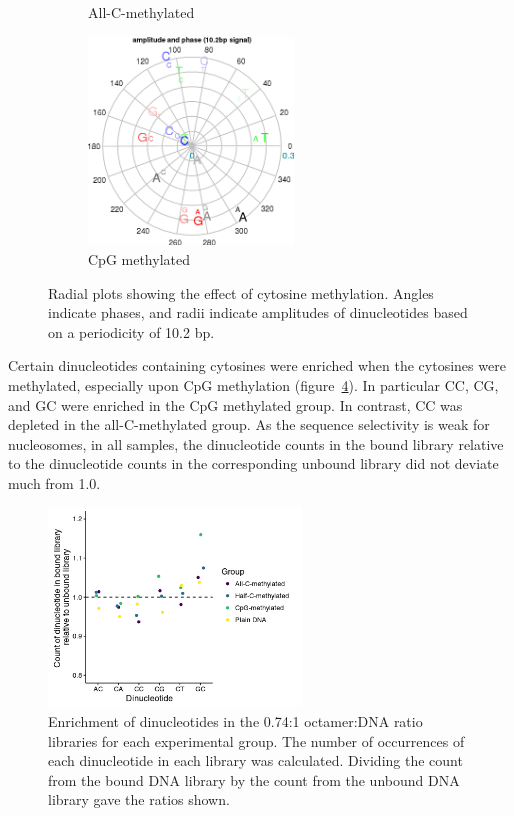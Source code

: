 \documentclass[a4paper, numbers=noenddot]{scrbook}
\begin{document}
\begin{figure}[htbp]
\begin{subfigure}[htbp]{0.6\textwidth}
    \caption{All-C-methylated}
    \label{fig:radial_mc_allmc}
  \end{subfigure}
  \begin{subfigure}[htbp]{0.6\textwidth}
    \centering
    \includegraphics[width=0.6\textwidth]{emsa_h8_radial}
    \caption{CpG methylated}
    \label{fig:radial_mc_cpg}
  \end{subfigure}
  \caption{Radial plots showing the effect of cytosine methylation.  Angles indicate phases, and radii indicate amplitudes of dinucleotides based on a periodicity of 10.2 bp.}
  \label{fig:radial_mc}
\end{figure}

Certain dinucleotides containing cytosines were enriched when the cytosines were methylated, especially upon CpG methylation (figure~\ref{fig:c2nt}).  In particular CC, CG, and GC were enriched in the CpG methylated group.  In contrast, CC was depleted in the all-C-methylated group.  As the sequence selectivity is weak for nucleosomes, in all samples, the dinucleotide counts in the bound library relative to the dinucleotide counts in the corresponding unbound library did not deviate much from 1.0.

\begin{figure}[htbp]
  \centering
  \includegraphics[width=0.6\textwidth]{c2nt}
  \caption{Enrichment of dinucleotides in the 0.74:1 octamer:DNA ratio libraries for each experimental group.  The number of occurrences of each dinucleotide in each library was calculated.  Dividing the count from the bound DNA library by the count from the unbound DNA library gave the ratios shown.} 
  \label{fig:c2nt}
\end{figure}
\end{document}

